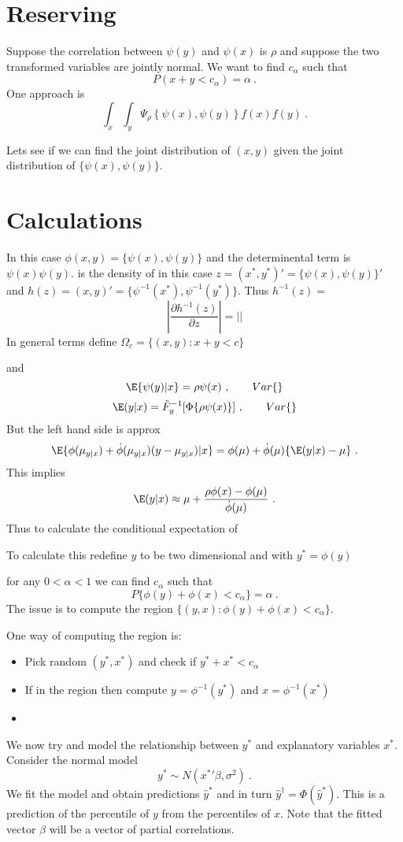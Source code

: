 \section{Reserving}
Suppose the correlation between $\psi(y)$ and $\psi(x)$ is $\rho$ and suppose the two transformed variables are jointly normal.   We want to find $c_\alpha$ such that
$$
P(x+y<c_\alpha)=\alpha\ .
$$
One approach is
$$
\int_x\int_y \Psi_\rho\left\{\psi(x),\psi(y)\right\}f(x)f(y)\ .
$$

Lets see if we can find the joint distribution of $(x,y)$ given the joint distribution of $\{\psi(x),\psi(y)\}$.

\section{Calculations} 
In this case $\phi(x,y)=\{\psi(x),\psi(y)\}$ and  the determinental term is $\psi(x)\psi(y)$.
is the density of 
in this case $z=(x^*,y^*)'=\{\psi(x),\psi(y)\}'$ and $h(z)=(x,y)'=\{\psi^{-1}(x^*),\psi^{-1}(y^*)\}$.   Thus $h^{-1}(z)=$
$$
\left|\frac{\partial h^{-1}(z)}{\partial z}\right| = \left|\right|
$$
In general terms define $\Omega_c=\{(x,y):x+y<c\}$


 and
$$
\E\{\psi(y)|x\}=\rho\psi(x)\ , \qquad Var\{\}
$$
$$
\E(y|x)=\tilde F_y^{-1}[\Phi\{\rho\psi(x)\}]\ , \qquad Var\{\}
$$
But the left hand side is approx
$$
\E\{\phi(\mu_{y|x})+\dot\phi(\mu_{y|x})(y-\mu_{y|x})|x\} = \phi(\mu)+\dot\phi(\mu)\{\E(y|x)-\mu\}\ .
$$
This implies
$$
\E(y|x)\approx\mu+\frac{\rho\phi(x)-\phi(\mu)}{\dot\phi(\mu)}\ .
$$
Thus to calculate the conditional expectation of 



To calculate this redefine $y$ to be two dimensional and with $y^*=\phi(y)$


for any $0<\alpha<1$ we can find $c_\alpha$ such that
$$
P\{\phi(y)+\phi(x)<c_\alpha\}=\alpha\ .
$$
The issue is to compute the region $\{(y,x): \phi(y)+\phi(x)<c_\alpha\}$.

One way of computing the region is:
\begin{itemize}
    \item Pick random $(y^*,x^*)$ and check if $y^*+x^*<c_\alpha$
    \item If in the region then compute $y=\phi^{-1}(y^*)$ and $x=\phi^{-1}(x^*)$ 
    \item 
\end{itemize}     

We now try and model the relationship between $y^*$ and explanatory variables $x^*$. Consider the normal model 
$$
y^* \sim N({x^*}'\beta,\sigma^2)\ .
$$
We fit the model and obtain predictions $\hat y^*$ and in turn $\hat y^\dag=\Phi(\hat y^*)$.  This is a prediction of the percentile of $y$ from the percentiles of $x$.  Note that the fitted vector $\hat\beta$ will be a vector of partial correlations.

